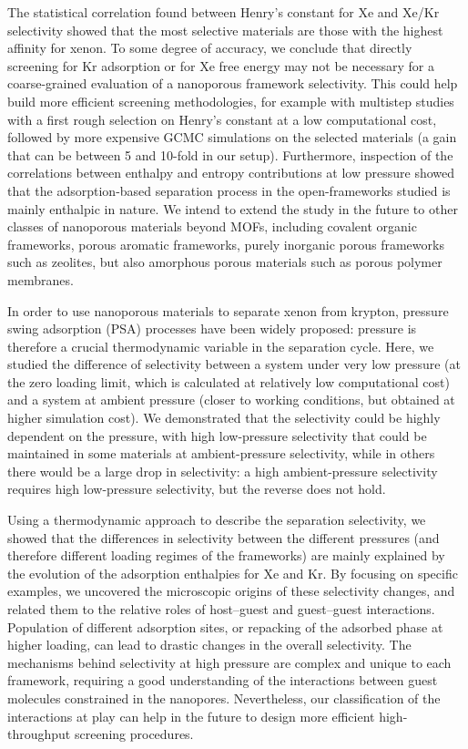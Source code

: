 \documentclass[main.tex]{subfiles}
\begin{document}
The statistical correlation found between Henry's constant for Xe and Xe/Kr selectivity showed that the most selective materials are those with the highest affinity for xenon. To some degree of accuracy, we conclude that directly screening for Kr adsorption or for Xe free energy may not be necessary for a coarse-grained evaluation of a nanoporous framework selectivity. This could help build more efficient screening methodologies, for example with multistep studies with a first rough selection on Henry's constant at a low computational cost, followed by more expensive GCMC simulations on the selected materials (a gain that can be between 5 and 10-fold in our setup). Furthermore, inspection of the correlations between enthalpy and entropy contributions at low pressure showed that the adsorption-based separation process in the open-frameworks studied is mainly enthalpic in nature. We intend to extend the study in the future to other classes of nanoporous materials beyond MOFs, including covalent organic frameworks, porous aromatic frameworks, purely inorganic porous frameworks such as zeolites, but also amorphous porous materials such as porous polymer membranes.

In order to use nanoporous materials to separate xenon from krypton, pressure swing adsorption (PSA) processes have been widely proposed: pressure is therefore a crucial thermodynamic variable in the separation cycle. Here, we studied the difference of selectivity between a system under very low pressure (at the zero loading limit, which is calculated at relatively low computational cost) and a system at ambient pressure (closer to working conditions, but obtained at higher simulation cost). We demonstrated that the selectivity could be highly dependent on the pressure, with high low-pressure selectivity that could be maintained in some materials at ambient-pressure selectivity, while in others there would be a large drop in selectivity: a high ambient-pressure selectivity requires high low-pressure selectivity, but the reverse does not hold.

Using a thermodynamic approach to describe the separation selectivity, we showed that the differences in selectivity between the different pressures (and therefore different loading regimes of the frameworks) are mainly explained by the evolution of the adsorption enthalpies for Xe and Kr. By focusing on specific examples, we uncovered the microscopic origins of these selectivity changes, and related them to the relative roles of host--guest and guest--guest interactions. Population of different adsorption sites, or repacking of the adsorbed phase at higher loading, can lead to drastic changes in the overall selectivity. The mechanisms behind selectivity at high pressure are complex and unique to each framework, requiring a good understanding of the interactions between guest molecules constrained in the nanopores. Nevertheless, our classification of the interactions at play can help in the future to design more efficient high-throughput screening procedures.


\OnlyInSubfile{\printglobalbibliography}
\end{document}
